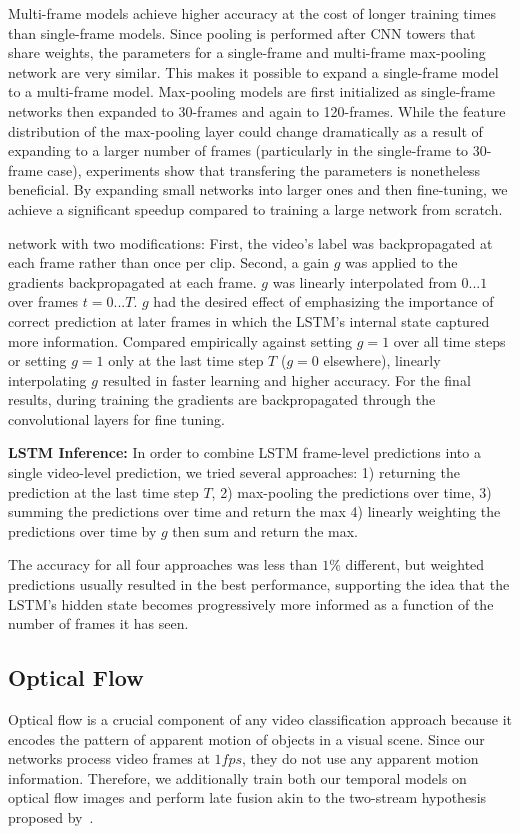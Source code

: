 \documentclass[10pt,twocolumn,letterpaper]{article}
\begin{document}
Multi-frame models achieve higher accuracy at the cost of longer
training times than single-frame models.
Since pooling is performed after CNN towers that
share weights, the parameters for a single-frame and multi-frame
max-pooling network are very similar.
This makes it possible to expand a single-frame model to a
multi-frame model. Max-pooling models are first
initialized as single-frame networks then expanded to 30-frames and
again to 120-frames. While the feature distribution of the max-pooling
layer could change dramatically as a result of expanding to a larger
number of frames (particularly in the single-frame to 30-frame case),
experiments show that transfering the parameters is nonetheless
beneficial. By expanding small networks into larger ones and then
fine-tuning, we achieve a significant speedup compared to training a
large network from scratch.

network with two modifications: First,  the
video's label was backpropagated at each frame rather than once per clip.
Second, a gain $g$ was applied to the gradients backpropagated at each frame.
$g$ was linearly interpolated from $0...1$ over frames $t=0...T$. $g$ had the
desired effect of emphasizing the importance of correct prediction at later
frames in which the LSTM's internal state captured more information. Compared
empirically against setting $g=1$ over all time steps or setting $g=1$ only at
the last time step $T$ ($g=0$ elsewhere), linearly interpolating $g$ resulted
in faster learning and higher accuracy. For the final results, during training
the gradients are backpropagated through the convolutional layers for fine
tuning.

\textbf{LSTM Inference:} In order to combine LSTM frame-level predictions into a single video-level
prediction, we tried several approaches: 1) returning the prediction at
the last time step $T$, 2) max-pooling the predictions over time,
3) summing the predictions over time and return the max 4)
linearly weighting the predictions over time by $g$ then sum and return
the max.

The accuracy for all four approaches was less than $1\%$ different,
but weighted predictions usually resulted in the best performance,
supporting the idea that the LSTM's hidden state becomes progressively
more informed as a function of the number of frames it has seen.

\vspace{-.6em}\subsection{Optical Flow}\vspace{-.6em}
Optical flow is a crucial component of any video classification approach because it encodes the pattern of
apparent motion of objects in a visual scene.
 Since our networks process video frames at $1fps$, they do not use any apparent motion information.
Therefore, we additionally train both our temporal models on optical flow
 images and perform late fusion akin to the two-stream hypothesis proposed by~\cite{simonyan2014two}.
\end{document}
